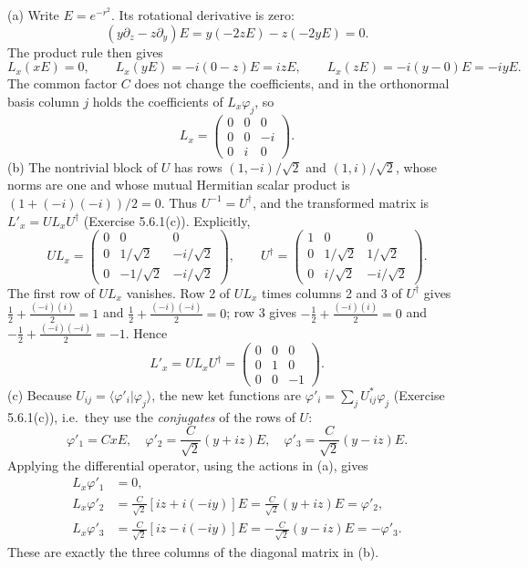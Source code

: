 (a) Write $E=e^{-r^2}$. Its rotational derivative is zero:
\[
(y\partial_z-z\partial_y)E=y(-2zE)-z(-2yE)=0.
\]
The product rule then gives
\[
L_x(xE)=0,\qquad L_x(yE)=-i(0-z)E=izE,\qquad
L_x(zE)=-i(y-0)E=-iyE.
\]
The common factor $C$ does not change the coefficients, and in the
orthonormal basis column $j$ holds the coefficients of $L_x\varphi_j$, so
\[
\boxed{L_x=\begin{pmatrix}0&0&0\\0&0&-i\\0&i&0\end{pmatrix}.}
\]
(b) The nontrivial block of $U$ has rows $(1,-i)/\sqrt2$ and
$(1,i)/\sqrt2$, whose norms are one and whose mutual Hermitian scalar
product is $(1+(-i)(-i))/2=0$. Thus $U^{-1}=U^\dagger$, and the
transformed matrix is $L'_x=UL_xU^\dagger$ (Exercise 5.6.1(c)).
Explicitly,
\[
UL_x=\begin{pmatrix}0&0&0\\0&1/\sqrt2&-i/\sqrt2\\
0&-1/\sqrt2&-i/\sqrt2\end{pmatrix},\qquad
U^\dagger=\begin{pmatrix}1&0&0\\0&1/\sqrt2&1/\sqrt2\\
0&i/\sqrt2&-i/\sqrt2\end{pmatrix}.
\]
The first row of $UL_x$ vanishes. Row 2 of $UL_x$ times columns 2 and 3
of $U^\dagger$ gives $\frac12+\frac{(-i)(i)}2=1$ and
$\frac12+\frac{(-i)(-i)}2=0$; row 3 gives
$-\frac12+\frac{(-i)(i)}2=0$ and $-\frac12+\frac{(-i)(-i)}2=-1$. Hence
\[
\boxed{L'_x=UL_xU^\dagger=\begin{pmatrix}0&0&0\\0&1&0\\0&0&-1\end{pmatrix}.}
\]
(c) Because $U_{ij}=\langle\varphi'_i|\varphi_j\rangle$, the new ket
functions are $\varphi'_i=\sum_jU_{ij}^*\varphi_j$ (Exercise 5.6.1(c)),
i.e.\ they use the \emph{conjugates} of the rows of $U$:
\[
\boxed{\varphi'_1=CxE,\quad
\varphi'_2=\frac{C}{\sqrt2}(y+iz)E,\quad
\varphi'_3=\frac{C}{\sqrt2}(y-iz)E.}
\]
Applying the differential operator, using the actions in (a), gives
\begin{align*}
L_x\varphi'_1&=0,\\
L_x\varphi'_2&=\frac C{\sqrt2}[iz+i(-iy)]E
=\frac C{\sqrt2}(y+iz)E=\varphi'_2,\\
L_x\varphi'_3&=\frac C{\sqrt2}[iz-i(-iy)]E
=-\frac C{\sqrt2}(y-iz)E=-\varphi'_3.
\end{align*}
These are exactly the three columns of the diagonal matrix in (b).

